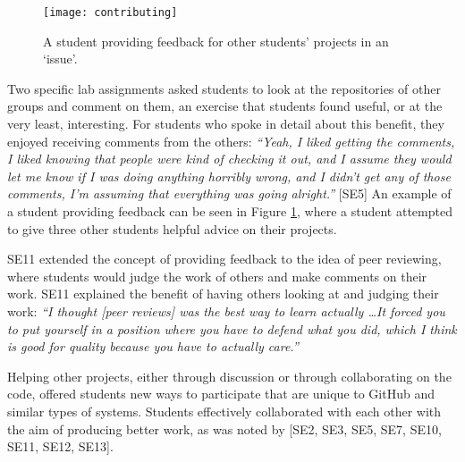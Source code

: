 \begin{figure}[h!]
 \caption{A student providing feedback for other students' projects in an `issue'.}
 \centering
   \texttt{[image: contributing]}
 \label{fig:contributing}
\end{figure}

Two specific lab assignments asked students to look at the repositories of other groups and comment on them, an exercise that students found useful, or at the very least, interesting. For students who spoke in detail about this benefit, they enjoyed receiving comments from the others: \textit{``Yeah, I liked getting the comments, I liked knowing that people were kind of checking it out, and I assume they would let me know if I was doing anything horribly wrong, and I didn't get any of those comments, I'm assuming that everything was going alright.''} [SE5] An example of a student providing feedback can be seen in Figure \ref{fig:contributing}, where a student attempted to give three other students helpful advice on their projects.

SE11 extended the concept of providing feedback to the idea of peer reviewing, where students would judge the work of others and make comments on their work. SE11 explained the benefit of having others looking at and judging their work: \textit{``I thought [peer reviews] was the best way to learn actually \ldots It forced you to put yourself in a position where you have to defend what you did, which I think is good for quality because you have to actually care.''}

Helping other projects, either through discussion or through collaborating on the code, offered students new ways to participate that are unique to GitHub and similar types of systems. Students effectively collaborated with each other with the aim of producing better work, as was noted by [SE2, SE3, SE5, SE7, SE10, SE11, SE12, SE13]. \\


